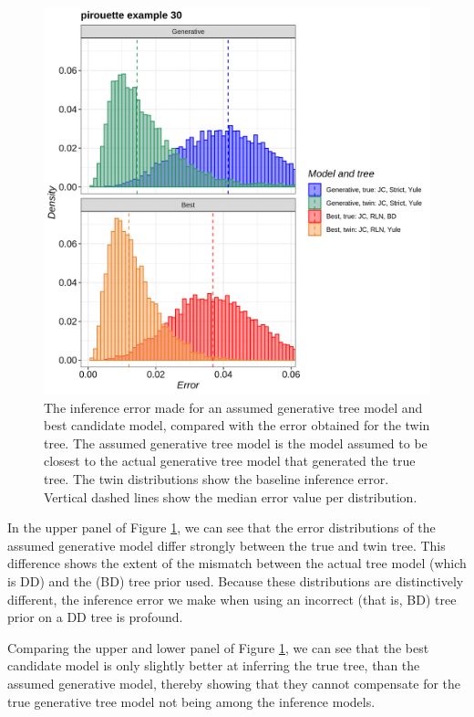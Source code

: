 \begin{figure}[H]
  \includegraphics[width=\textwidth]{pirouette_example_30/errors.png}
  \caption{
    The inference error made 
    for an assumed generative tree model and best candidate model,
    compared with the error obtained for the twin tree.
    The assumed generative tree model is the model assumed to be closest to
    the actual generative tree model that generated the true tree.
    The twin distributions show the baseline inference error.
    Vertical dashed lines show the median error value per distribution.
  }
  \label{fig:example_30}
\end{figure}

In the upper panel of Figure \ref{fig:example_30},
we can see that the error distributions of the assumed generative model
differ strongly between the true and twin tree. 
This difference shows the extent of the mismatch between
the actual tree model (which is DD) and the (BD) tree prior used.
Because these distributions are distinctively different,
the inference error we make when using an 
incorrect (that is, BD) tree prior on a DD tree
is profound.

Comparing the upper and lower panel of Figure \ref{fig:example_30}, 
we can see that the best
candidate model is only slightly better at inferring the true tree,
than the assumed generative model, thereby showing that they cannot compensate for the true generative tree model not being among the inference models.

